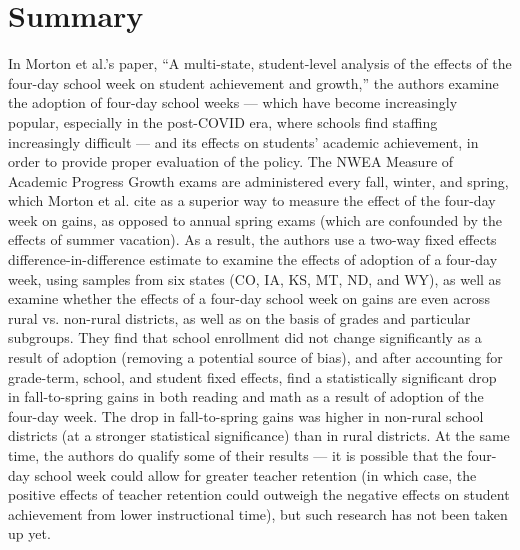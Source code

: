 \documentclass[8pt]{extarticle}
\title{}
\author{}
\date{}
\begin{document}
  \section{Summary}%
  In Morton et al.'s paper, ``A multi-state, student-level analysis of the effects of the four-day school week on student achievement and growth,''\supercite{morton_et_al} the authors examine the adoption of four-day school weeks --- which have become increasingly popular, especially in the post-COVID era, where schools find staffing increasingly difficult --- and its effects on students' academic achievement, in order to provide proper evaluation of the policy. The NWEA Measure of Academic Progress Growth exams are administered every fall, winter, and spring, which Morton et al. cite as a superior way to measure the effect of the four-day week on gains, as opposed to annual spring exams (which are confounded by the effects of summer vacation). As a result, the authors use a two-way fixed effects difference-in-difference estimate to examine the effects of adoption of a four-day week, using samples from six states (CO, IA, KS, MT, ND, and WY), as well as examine whether the effects of a four-day school week on gains are even across rural vs. non-rural districts, as well as on the basis of grades and particular subgroups. They find that school enrollment did not change significantly as a result of adoption (removing a potential source of bias), and after accounting for grade-term, school, and student fixed effects, find a statistically significant drop in fall-to-spring gains in both reading and math as a result of adoption of the four-day week. The drop in fall-to-spring gains was higher in non-rural school districts (at a stronger statistical significance) than in rural districts. At the same time, the authors do qualify some of their results --- it is possible that the four-day school week could allow for greater teacher retention (in which case, the positive effects of teacher retention could outweigh the negative effects on student achievement from lower instructional time), but such research has not been taken up yet.
\end{document}
